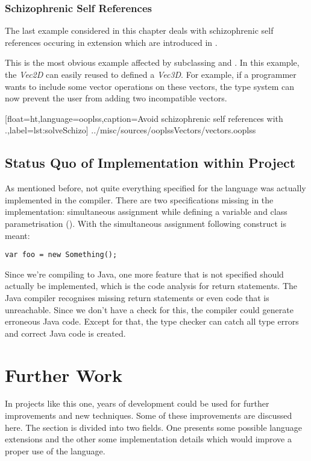 \subsubsection{Schizophrenic Self References}
The last example considered in this chapter deals with schizophrenic self
references occuring in extension which are introduced in .

This is the most obvious example affected by subclassing and
\mytype. In this example, the \emph{Vec2D} can easily reused to defined a
\emph{Vec3D}. For example, if a programmer wants to include some vector
operations on these vectors, the type system can now prevent the user
from adding two incompatible vectors.


[float=ht,language=ooplss,caption=Avoid schizophrenic self references with \mytype.,label=lst:solveSchizo]
{../misc/sources/ooplssVectors/vectors.ooplss}

\subsection{Status Quo of Implementation within Project}
\label{sec:statusQuo}

As mentioned before, not quite everything specified for the language
was actually implemented in the compiler. There are two specifications missing
in the implementation: simultaneous assignment while defining a variable
and class parametrisation (). With the simultaneous
assignment following construct is meant:

\begin{lstlisting}[float=ht,language=ooplss,caption=Assignment on defining a variable.,label=lst:vardefAssign]
var foo = new Something();
\end{lstlisting}

Since we're compiling to Java, one more feature that
is not specified should actually be implemented, which is the code analysis
for return statements. The Java compiler recognises missing return statements
or even code that is unreachable. Since we don't have a check for this, the
compiler could generate erroneous Java code. Except for that, the type checker
can catch all type errors and correct Java code is created.

\section{Further Work}
\label{sec:futureWork}
In projects like this one, years of development could be used for
further improvements and new techniques. Some of these improvements are
discussed here. The section is divided into two fields. One presents some
possible language extensions and the other some implementation details
which would improve a proper use of the language.

